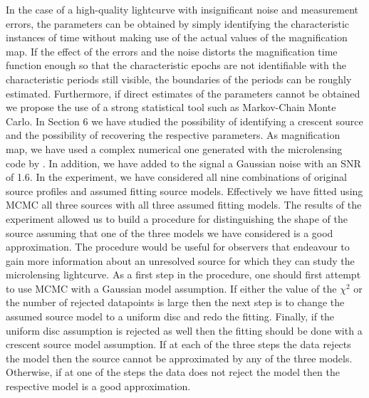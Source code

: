 \documentclass[usenatbib]{mn2e}
\begin{document}
In the case of a high-quality lightcurve with insignificant noise and measurement errors, the parameters can be obtained 
by simply identifying the characteristic instances of time without making use of the actual values of the magnification
 map. If the effect of the errors and the noise distorts the magnification time function enough so that the 
characteristic epochs are not identifiable with the characteristic periods still visible, the boundaries of the periods 
can be roughly estimated. Furthermore, if direct estimates of the parameters cannot be obtained we propose the use of a strong
statistical tool such as Markov-Chain Monte Carlo. In Section 6  we have studied the possibility of identifying a crescent 
source and  the possibility of recovering the respective parameters. As magnification map, we have used a complex numerical 
one generated with the microlensing code by \cite{1999A&A...346L...5W}. In addition, we have added to the signal a Gaussian 
noise with an SNR of 1.6.  In the experiment, we have considered all nine combinations of original source profiles and assumed fitting source models.
Effectively we have fitted using MCMC all three sources with all three assumed fitting models. The results of the experiment allowed us to build a 
procedure for distinguishing the shape of the source assuming that one of the three models we have considered is a good approximation.  
The procedure would be useful for observers that endeavour to gain more information about an unresolved source for which they can study 
the microlensing lightcurve.  As a first step in the procedure, one should first attempt to use MCMC with a Gaussian model assumption. 
If either the value of the $\chi^2$ or the number of rejected datapoints is large then the next step is to change the assumed source model to 
a uniform disc and redo the fitting. Finally, if the uniform disc assumption is rejected as well then the fitting should be done with a 
crescent source model assumption. If at each of the three steps the data rejects the model then the source cannot be approximated by any of the three models. 
Otherwise, if at one of the steps the data does not reject the model then the respective model is a good approximation.   
\end{document}
